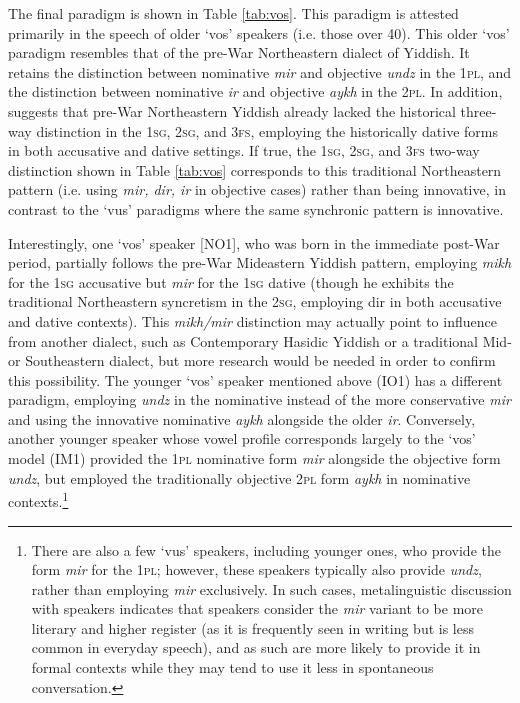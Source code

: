 \documentclass[output=paper, hidelinks]{langscibook}
\begin{document}
\newpage
The final paradigm is shown in Table \ref{tab:vos}. This paradigm is attested primarily in the speech of older ‘vos’ speakers (i.e. those over 40). This older ‘vos’ paradigm resembles that of the pre-War Northeastern dialect of Yiddish. It retains the distinction between nominative \textit{mir} and objective \textit{undz} in the 1\textsc{pl}, and the distinction between nominative \textit{ir} and objective \textit{aykh} in the 2\textsc{pl}. In addition, \citep[184]{Jacobs05} suggests that pre-War Northeastern Yiddish already lacked the historical three-way distinction in the 1\textsc{sg}, 2\textsc{sg}, and 3\textsc{fs}, employing the historically dative forms in both accusative and dative settings. If true, the 1\textsc{sg}, 2\textsc{sg}, and 3\textsc{fs} two-way distinction shown in Table \ref{tab:vos} corresponds to this traditional Northeastern pattern (i.e. using \textit{mir, dir, ir} in objective cases) rather than being innovative, in contrast to the ‘vus’ paradigms where the same synchronic pattern is innovative. 

Interestingly, one ‘vos’ speaker [NO1], who was born in the immediate post-War period, partially follows the pre-War Mideastern Yiddish pattern, employing \textit{mikh} for the 1\textsc{sg} accusative but \textit{mir} for the 1\textsc{sg} dative (though he exhibits the traditional Northeastern syncretism in the 2\textsc{sg}, employing dir in both accusative and dative contexts). This \textit{mikh/mir} distinction may actually point to influence from another dialect, such as Contemporary Hasidic Yiddish or a traditional Mid- or Southeastern dialect, but more research would be needed in order to confirm this possibility. The younger ‘vos’ speaker mentioned above (IO1) has a different paradigm, employing \textit{undz} in the nominative instead of the more conservative \textit{mir} and using the innovative nominative \textit{aykh} alongside the older \textit{ir}. Conversely, another younger speaker whose vowel profile corresponds largely to the ‘vos’ model (IM1) provided the 1\textsc{pl} nominative form \textit{mir} alongside the objective form \textit{undz}, but employed the traditionally objective 2\textsc{pl} form \textit{aykh} in nominative contexts.\footnote{There are also a few ‘vus’ speakers, including younger ones, who provide the form \textit{mir} for the 1\textsc{pl}; however, these speakers typically also provide \textit{undz}, rather than employing \textit{mir} exclusively. In such cases, metalinguistic discussion with speakers indicates that speakers consider the \textit{mir} variant to be more literary and higher register (as it is frequently seen in writing but is less common in everyday speech), and as such are more likely to provide it in formal contexts while they may tend to use it less in spontaneous conversation.}
\end{document}
